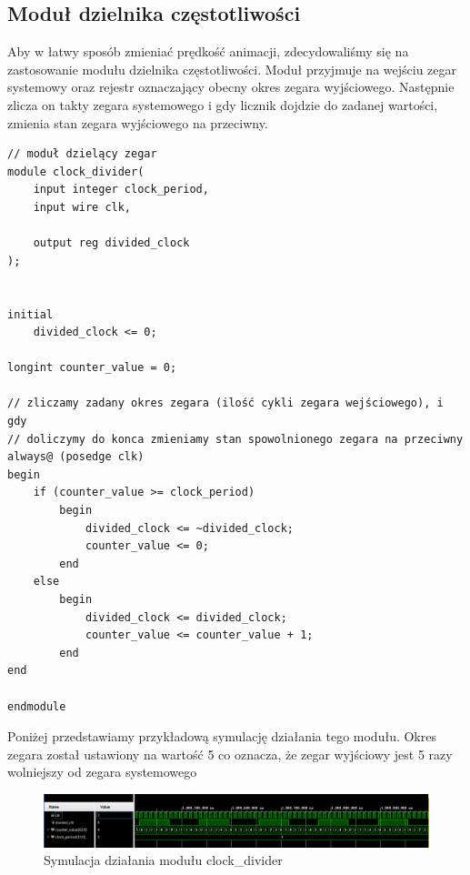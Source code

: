 \documentclass[a4paper]{article}
\begin{document}
\subsection{Moduł dzielnika częstotliwości}
Aby w łatwy sposób zmieniać prędkość animacji, zdecydowaliśmy się na zastosowanie modułu dzielnika częstotliwości.
Moduł przyjmuje na wejściu zegar systemowy oraz rejestr oznaczający obecny okres
zegara wyjściowego. Następnie zlicza on takty zegara systemowego i gdy licznik dojdzie
do zadanej wartości, zmienia stan zegara wyjściowego na przeciwny.
\begin{verbatim}
// moduł dzielący zegar
module clock_divider(
    input integer clock_period,
    input wire clk,
    
    output reg divided_clock
);


initial
    divided_clock <= 0;

longint counter_value = 0;

// zliczamy zadany okres zegara (ilość cykli zegara wejściowego), i gdy 
// doliczymy do konca zmieniamy stan spowolnionego zegara na przeciwny
always@ (posedge clk)
begin 
    if (counter_value >= clock_period) 
        begin
            divided_clock <= ~divided_clock;
            counter_value <= 0;
        end
    else 
        begin
            divided_clock <= divided_clock;
            counter_value <= counter_value + 1;
        end
end

endmodule
\end{verbatim}

Poniżej przedstawiamy przykładową symulację działania tego modułu.
Okres zegara został ustawiony na wartość 5 co oznacza, że zegar wyjściowy jest 5 razy wolniejszy od zegara systemowego

\begin{figure}[H]
    \centering
    \includegraphics[width=\textwidth]{clock_divider_simulation.png}
    \caption{Symulacja działania modułu clock\_divider}
\end{figure}
\end{document}
